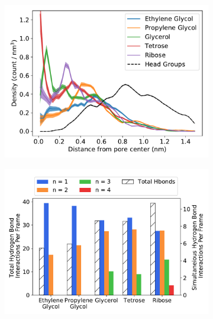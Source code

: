 \documentclass{article}
\begin{document}
  \begin{figure}[!htb]
  \centering
  \begin{subfigure}{0.45\textwidth}
  \includegraphics[width=\linewidth]{polyols_rdf.pdf}
  \caption{}\label{fig:polyols_rdf}
  \end{subfigure}
  \begin{subfigure}{0.50\textwidth}
  \vspace{-0.275cm}
  \includegraphics[width=\linewidth]{multi_hbonds.pdf}
  \caption{}\label{fig:multi_hbonds}
  \end{subfigure}

\end{figure}
\end{document}
